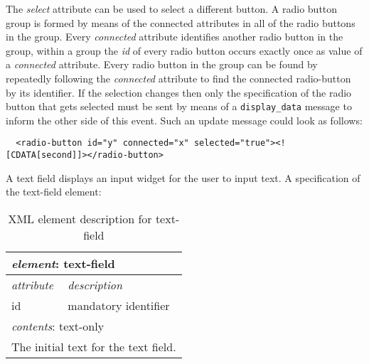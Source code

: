 \documentclass{article}
\newcommand{\msg}[1]{\texttt{#1}}
\begin{document}
   \noindent The \textit{select} attribute can be used to select a different button. A
   radio button group is formed by means of the connected attributes in all of
   the radio buttons in the group. Every \textit{connected} attribute
   identifies another radio button in the group, within a group the \textit{id}
   of every radio button occurs exactly once as value of a \textit{connected}
   attribute.  Every radio button in the group can be found by repeatedly
   following the \textit{connected} attribute to find the connected
   radio-button by its identifier. If the selection changes then only the
   specification of the radio button that gets selected must be sent by means
   of a \msg{display\_data} message to inform the other side of this event.
   Such an update message could look as follows:

    \small \begin{verbatim}
  <radio-button id="y" connected="x" selected="true"><![CDATA[second]]></radio-button>\end{verbatim}
  \normalsize

   \noindent A text field displays an input widget for the user to input text.
   A specification of the text-field element:
   
    \begin{table}[H]
     \begin{center}
     \begin{tabular}{|l|l|}
       \hline
        \multicolumn{2}{|l|}{\textit{element}: text-field} \\
       \hline \hline
        \textit{attribute} & \textit{description} \\
       \hline
        id                 & mandatory identifier \\
       \hline \hline
        \multicolumn{2}{|l|}{\textit{contents}: text-only} \\
       \hline
         \multicolumn{2}{|l|}{The initial text for the text field.} \\
       \hline
     \end{tabular}
     \end{center}
     \label{figure:element_text_field}
     \caption{XML element description for text-field}
    \end{table}

\end{document}
